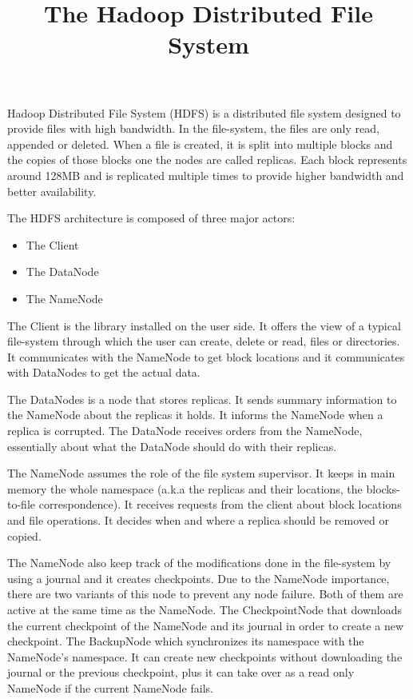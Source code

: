 \documentclass{article}
\title{The Hadoop Distributed File System}
\begin{document}
\maketitle


Hadoop Distributed File System (HDFS) is a distributed file system designed to provide files with high bandwidth.
In the file-system, the files are only read, appended or deleted.
When a file is created, it is split into multiple blocks and the copies of those blocks one the nodes are called replicas.
Each block represents around 128MB and is replicated multiple times to provide higher bandwidth and better availability.

The HDFS architecture is composed of three major actors:
\begin{itemize}
	\item The Client
	\item The DataNode
	\item The NameNode
\end{itemize}

The Client is the library installed on the user side.
It offers the view of a typical file-system through which the user can create, delete or read, files or directories.
It communicates with the NameNode to get block locations and it communicates with DataNodes to get the actual data.

The DataNodes is a node that stores replicas.
It sends summary information to the NameNode about the replicas it holds.
It informs the NameNode when a replica is corrupted.
The DataNode receives orders from the NameNode, essentially about what the DataNode should do with their replicas.

The NameNode assumes the role of the file system supervisor.
It keeps in main memory the whole namespace (a.k.a the replicas and their locations, the blocks-to-file correspondence). 
It receives requests from the client about block locations and file operations.
It decides when and where a replica should be removed or copied.

The NameNode also keep track of the modifications done in the file-system by using a journal and it creates checkpoints.
Due to the NameNode importance, there are two variants of this node to prevent any node failure.
Both of them are active at the same time as the NameNode.
The CheckpointNode that downloads the current checkpoint of the NameNode and its journal in order to create a new checkpoint.
The BackupNode which synchronizes its namespace with the NameNode's namespace.
It can create new checkpoints without downloading the journal or the previous checkpoint, plus it can take over as a read only NameNode if the current NameNode fails.
\end{document}
